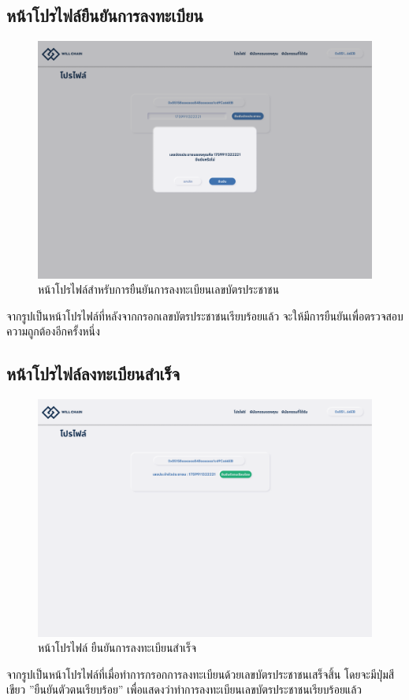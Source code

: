 \documentclass[12pt,oneside,openright,a4paper]{cpe-thai-project}
\begin{document}
\subsection{หน้าโปรไฟล์ยืนยันการลงทะเบียน}
		\begin{figure}[!thb]
			\centering
			\includegraphics[scale=0.2]{profileConfirm}
			\caption{หน้าโปรไฟล์สำหรับการยืนยันการลงทะเบียนเลขบัตรประชาชน}
		\end{figure}
		\FloatBarrier
		\tab จากรูปเป็นหน้าโปรไฟล์ที่หลังจากกรอกเลขบัตรประชาชนเรียบร้อยแล้ว จะให้มีการยืนยันเพื่อตรวจสอบความถูกต้องอีกครั้งหนึ่ง
\subsection{หน้าโปรไฟล์ลงทะเบียนสำเร็จ}
		\begin{figure}[!thb]
			\centering
			\includegraphics[scale=0.2]{profileSuccess}
			\caption{หน้าโปรไฟล์ ยืนยันการลงทะเบียนสำเร็จ}
		\end{figure}
		\FloatBarrier
		\tab จากรูปเป็นหน้าโปรไฟล์ที่เมื่อทำการกรอกการลงทะเบียนด้วยเลขบัตรประชาชนเสร็จสิ้น โดยจะมีปุ่มสีเขียว ''ยืนยันตัวตนเรียบร้อย'' เพื่อแสดงว่าทำการลงทะเบียนเลขบัตรประชาชนเรียบร้อยแล้ว
		
\end{document}
